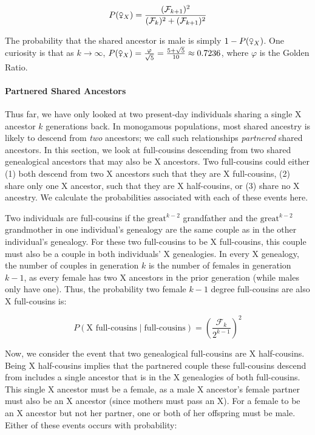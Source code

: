 \documentclass[11pt]{article}
\newcommand{\fsxa}{\venus_X}
\begin{document}
\begin{equation}
  P(\fsxa) = \frac{(\mathcal{F}_{k+1})^2}{(\mathcal{F}_k)^2 + (\mathcal{F}_{k+1})^2}
\end{equation}

The probability that the shared ancestor is male is simply $1-P(\fsxa)$. One
curiosity is that as $k \to \infty$, $P(\fsxa) = \frac{\varphi}{\sqrt{5}} =
\frac{5 + \sqrt{5}}{10} \approx 0.7236$, where $\varphi$ is the Golden Ratio.

\paragraph{Partnered Shared Ancestors}

Thus far, we have only looked at two present-day individuals sharing a single X
ancestor $k$ generations back. In monogamous populations, most shared ancestry
is likely to descend from \emph{two} ancestors; we call such relationships
\emph{partnered} shared ancestors. In this section, we look at full-cousins
descending from two shared genealogical ancestors that may also be X ancestors.
Two full-cousins could either (1) both descend from two X ancestors such that
they are X full-cousins, (2) share only one X ancestor, such that they are X
half-cousins, or (3) share no X ancestry. We calculate the probabilities
associated with each of these events here.

Two individuals are full-cousins if the $\text{great}^{k-2}$ grandfather and
the $\text{great}^{k-2}$ grandmother in one individual's genealogy are the same
couple as in the other individual's genealogy. For these two full-cousins to be
X full-cousins, this couple must also be a couple in both individuals' X
genealogies. In every X genealogy, the number of couples in generation $k$ is
the number of females in generation $k-1$, as every female has two X ancestors
in the prior generation (while males only have one). Thus, the probability two
female $k-1$ degree full-cousins are also X full-cousins is:

\begin{equation}
  P(\text{X full-cousins} \; | \; \text{full-cousins}) = 
    \left( \frac{\mathcal{F}_k}{2^{k-1}} \right)^2
\end{equation}


Now, we consider the event that two genealogical full-cousins are X
half-cousins. Being X half-cousins implies that the partnered couple these
full-cousins descend from includes a single ancestor that is in the X
genealogies of both full-cousins. This single X ancestor must be a female, as a
male X ancestor's female partner must also be an X ancestor (since mothers must
pass an X). For a female to be an X ancestor but not her partner, one or both
of her offspring must be male. Either of these events occurs with probability:
\end{document}
